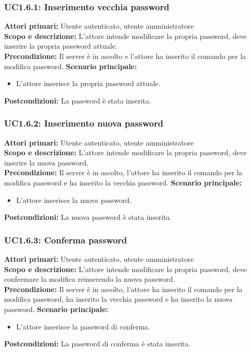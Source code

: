 \documentclass{scalatekids-article}
\begin{document}
\subsubsection{UC1.6.1: Inserimento vecchia password}

\textbf{Attori primari:} Utente autenticato, utente amministratore\\
\textbf{Scopo e descrizione:} L'attore intende modificare la propria password, deve inserire la propria password attuale.\\
\textbf{Precondizione:} Il server è in ascolto e l'attore ha inserito il comando per la modifica password.
\textbf{Scenario principale:}
\begin{itemize}
\item L'attore inserisce la propria password attuale.
\end{itemize}
\textbf{Postcondizioni:} La password è stata inserita.

\subsubsection{UC1.6.2: Inserimento nuova password}

\textbf{Attori primari:} Utente autenticato, utente amministratore\\
\textbf{Scopo e descrizione:} L'attore intende modificare la propria password, deve inserire la nuova password.\\
\textbf{Precondizione:} Il server è in ascolto, l'attore ha inserito il comando per la modifica password e ha inserito la vecchia password.
\textbf{Scenario principale:}
\begin{itemize}
\item L'attore inserisce la nuova password.
\end{itemize}
\textbf{Postcondizioni:} La nuova password è stata inserita.

\subsubsection{UC1.6.3: Conferma password}

\textbf{Attori primari:} Utente autenticato, utente amministratore\\
\textbf{Scopo e descrizione:} L'attore intende modificare la propria password, deve confermare la modifica reinserendo la nuova password.\\
\textbf{Precondizione:} Il server è in ascolto, l'attore ha inserito il comando per la modifica password, ha inserito la vecchia password e ha inserito la nuova password.
\textbf{Scenario principale:}
\begin{itemize}
\item L'attore inserisce la password di conferma.
\end{itemize}
\textbf{Postcondizioni:} La password di conferma è stata inserita.
\end{document}
